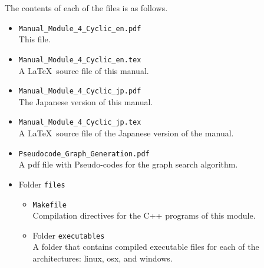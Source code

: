 \documentclass[11pt,titlepage,dvipdfmx,twoside]{book}
\begin{document}
\smallskip
The contents of each of the files is as follows.
%
\begin{itemize}		
 \item {\tt Manual\_Module\_4\_Cyclic\_en.pdf}\\
 This file.
 \item {\tt Manual\_Module\_4\_Cyclic\_en.tex}\\
 A \LaTeX~source file of this manual.
 \item {\tt Manual\_Module\_4\_Cyclic\_jp.pdf}\\
 The Japanese version of this manual.
 \item {\tt Manual\_Module\_4\_Cyclic\_jp.tex}\\
 A \LaTeX~source file of the Japanese version of the manual.
\item{ {\tt Pseudocode\_Graph\_Generation.pdf}}\\
  A pdf file with Pseudo-codes for the graph search algorithm.
 \item Folder {\tt files}
 \begin{itemize}
 \item {\tt Makefile} \\
	    Compilation directives for the C++ programs of this module.
    \item Folder {\tt executables}\\
    A folder that contains compiled executable files for 
    each of the architectures: linux, osx, and windows.
    

\end{itemize}
\end{itemize}
\end{document}

